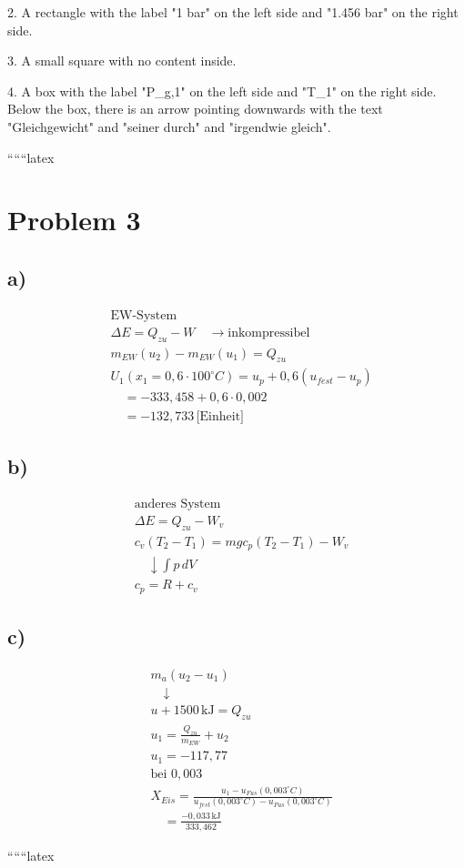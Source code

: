 2. A rectangle with the label "1 bar" on the left side and "1.456 bar" on the right side.

3. A small square with no content inside.

4. A box with the label "P_{g,1}" on the left side and "T_{1}" on the right side. Below the box, there is an arrow pointing downwards with the text "Gleichgewicht" and "seiner durch" and "irgendwie gleich".

``````latex


\section*{Problem 3}

\subsection*{a)}

\[
\begin{aligned}
    &\text{EW-System} \\
    &\Delta E = Q_{zu} - W \quad \rightarrow \text{inkompressibel} \\
    &m_{EW}(u_2) - m_{EW}(u_1) = Q_{zu} \\
    &U_1 \left( x_1 = 0,6 \cdot 100^\circ C \right) = u_p + 0,6 (u_{fest} - u_p) \\
    &\quad = -333,458 + 0,6 \cdot 0,002 \\
    &\quad = -132,733 \, \text{[Einheit]}
\end{aligned}
\]

\subsection*{b)}

\[
\begin{aligned}
    &\text{anderes System} \\
    &\Delta E = Q_{zu} - W_v \\
    &c_v (T_2 - T_1) = m g c_p (T_2 - T_1) - W_v \\
    &\quad \downarrow \int p \, dV \\
    &c_p = R + c_v
\end{aligned}
\]

\subsection*{c)}

\[
\begin{aligned}
    &m_{a} (u_2 - u_1) \\
    &\quad \downarrow \\
    &u + 1500 \, \text{kJ} = Q_{zu} \\
    &u_1 = \frac{Q_{zu}}{m_{EW}} + u_2 \\
    &u_1 = -117,77 \\
    &\text{bei } 0,003 \\
    &X_{Eis} = \frac{u_1 - u_{Fus}(0,003^\circ C)}{u_{fest}(0,003^\circ C) - u_{Fus}(0,003^\circ C)} \\
    &\quad = \frac{-0,033 \, \text{kJ}}{333,462}
\end{aligned}
\]

``````latex


